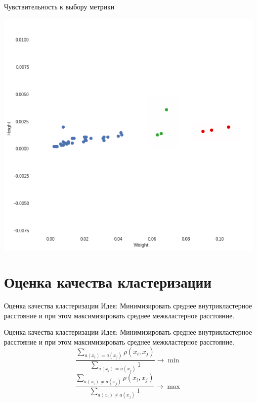\documentclass[10pt]{beamer}
\begin{document}
\begin{frame}{Чувствительность к выбору метрики}
	\begin{center}
	  \includegraphics[height=0.8 \textheight, keepaspectratio = true]{images/weight_height4}  
	\end{center}
\end{frame}

\section{Оценка качества кластеризации}

\begin{frame}{Оценка качества кластеризации}
  \alert{Идея}: Минимизировать среднее внутрикластерное расстояние и при этом максимизировать среднее межкластерное расстояние.
\end{frame}

\begin{frame}{Оценка качества кластеризации}
  \alert{Идея}: Минимизировать среднее внутрикластерное расстояние и при этом максимизировать среднее межкластерное расстояние.
	\bigbreak
	$${\frac{\sum\limits_{a(x_i) = a(x_j)} \rho(x_i, x_j)}{\sum\limits_{a(x_i) = a(x_j)} 1} \rightarrow \min}$$
	\bigbreak
	$${\frac{\sum\limits_{a(x_i) \neq a(x_j)} \rho(x_i, x_j)}{\sum\limits_{a(x_i) \neq a(x_j)} 1} \rightarrow \max}$$
\end{frame}
\end{document}
